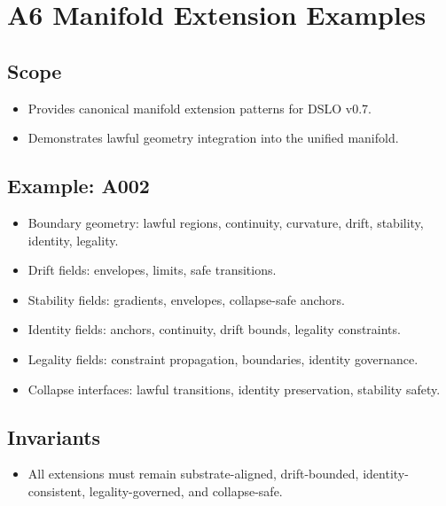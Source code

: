 \section{A6 Manifold Extension Examples}

\subsection{Scope}
\begin{itemize}
    \item Provides canonical manifold extension patterns for DSLO v0.7.
    \item Demonstrates lawful geometry integration into the unified manifold.
\end{itemize}

\subsection{Example: A002}
\begin{itemize}
    \item Boundary geometry: lawful regions, continuity, curvature, drift, stability, identity, legality.
    \item Drift fields: envelopes, limits, safe transitions.
    \item Stability fields: gradients, envelopes, collapse-safe anchors.
    \item Identity fields: anchors, continuity, drift bounds, legality constraints.
    \item Legality fields: constraint propagation, boundaries, identity governance.
    \item Collapse interfaces: lawful transitions, identity preservation, stability safety.
\end{itemize}

\subsection{Invariants}
\begin{itemize}
    \item All extensions must remain substrate-aligned, drift-bounded, identity-consistent, legality-governed, and collapse-safe.
\end{itemize}
